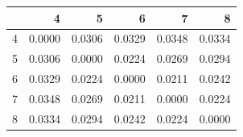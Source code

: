 \begin{tabular}{lrrrrr}
\toprule
 & 4 & 5 & 6 & 7 & 8 \\
\midrule
4 & 0.0000 & 0.0306 & 0.0329 & 0.0348 & 0.0334 \\
5 & 0.0306 & 0.0000 & 0.0224 & 0.0269 & 0.0294 \\
6 & 0.0329 & 0.0224 & 0.0000 & 0.0211 & 0.0242 \\
7 & 0.0348 & 0.0269 & 0.0211 & 0.0000 & 0.0224 \\
8 & 0.0334 & 0.0294 & 0.0242 & 0.0224 & 0.0000 \\
\bottomrule
\end{tabular}
